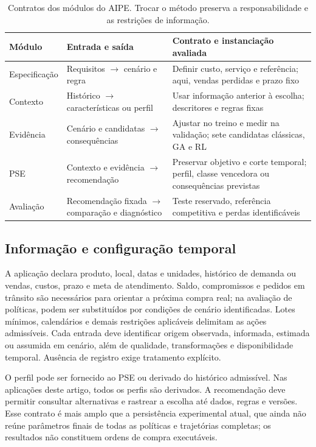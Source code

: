 \documentclass[preprint,12pt]{elsarticle}
\begin{document}
\begin{table}[htbp]\centering\small
\caption{Contratos dos módulos do AIPE. Trocar o método preserva a responsabilidade e as restrições de informação.}\label{tab:modules}
\begin{tabular}{@{}p{2.4cm}p{4.0cm}p{4.8cm}@{}}\toprule
Módulo & Entrada e saída & Contrato e instanciação avaliada\\\midrule
Especificação & Requisitos $\to$ cenário e regra & Definir custo, serviço e referência; aqui, vendas perdidas e prazo fixo\\
Contexto & Histórico $\to$ características ou perfil & Usar informação anterior à escolha; descritores e regras fixas\\
Evidência & Cenário e candidatas $\to$ consequências & Ajustar no treino e medir na validação; sete candidatas clássicas, GA e RL\\
PSE & Contexto e evidência $\to$ recomendação & Preservar objetivo e corte temporal; perfil, classe vencedora ou consequências previstas\\
Avaliação & Recomendação fixada $\to$ comparação e diagnóstico & Teste reservado, referência competitiva e perdas identificáveis\\\bottomrule
\end{tabular}\end{table}

\subsection{Informação e configuração temporal}
A aplicação declara produto, local, datas e unidades, histórico de demanda ou vendas, custos, prazo e meta de atendimento. Saldo, compromissos e pedidos em trânsito são necessários para orientar a próxima compra real; na avaliação de políticas, podem ser substituídos por condições de cenário identificadas. Lotes mínimos, calendários e demais restrições aplicáveis delimitam as ações admissíveis. Cada entrada deve identificar origem observada, informada, estimada ou assumida em cenário, além de qualidade, transformações e disponibilidade temporal. Ausência de registro exige tratamento explícito.

O perfil pode ser fornecido ao PSE ou derivado do histórico admissível. Nas aplicações deste artigo, todos os perfis são derivados. A recomendação deve permitir consultar alternativas e rastrear a escolha até dados, regras e versões. Esse contrato é mais amplo que a persistência experimental atual, que ainda não reúne parâmetros finais de todas as políticas e trajetórias completas; os resultados não constituem ordens de compra executáveis.
\end{document}
